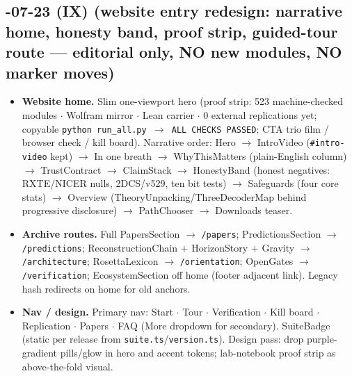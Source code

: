 \documentclass[11pt]{article}
\begin{document}
\subsection*{-07-23 (IX) (website entry redesign: narrative home, honesty band, proof strip, guided-tour route --- editorial only, NO new modules, NO marker moves)}
\begin{itemize}[leftmargin=1.5em]
\item \textbf{Website home.} Slim one-viewport hero (proof strip: 523 machine-checked modules $\cdot$ Wolfram mirror $\cdot$ Lean carrier $\cdot$ 0 external replications yet; copyable \texttt{python run\_all.py $\to$ ALL CHECKS PASSED}; CTA trio film / browser check / kill board). Narrative order: Hero $\to$ IntroVideo (\texttt{\#intro-video} kept) $\to$ In one breath $\to$ WhyThisMatters (plain-English column) $\to$ TrustContract $\to$ ClaimStack $\to$ HonestyBand (honest negatives: RXTE/NICER nulls, 2DCS/v529, ten bit tests) $\to$ Safeguards (four core stats) $\to$ Overview (TheoryUnpacking/ThreeDecoderMap behind progressive disclosure) $\to$ PathChooser $\to$ Downloads teaser.
\item \textbf{Archive routes.} Full PapersSection $\to$ \texttt{/papers}; PredictionsSection $\to$ \texttt{/predictions}; ReconstructionChain $+$ HorizonStory $+$ Gravity $\to$ \texttt{/architecture}; RosettaLexicon $\to$ \texttt{/orientation}; OpenGates $\to$ \texttt{/verification}; EcosystemSection off home (footer adjacent link). Legacy hash redirects on home for old anchors.
\item \textbf{Nav / design.} Primary nav: Start $\cdot$ Tour $\cdot$ Verification $\cdot$ Kill board $\cdot$ Replication $\cdot$ Papers $\cdot$ FAQ (More dropdown for secondary). SuiteBadge (static per release from \texttt{suite.ts}/\texttt{version.ts}). Design pass: drop purple-gradient pills/glow in hero and accent tokens; lab-notebook proof strip as above-the-fold visual.
\end{itemize}
\end{document}
